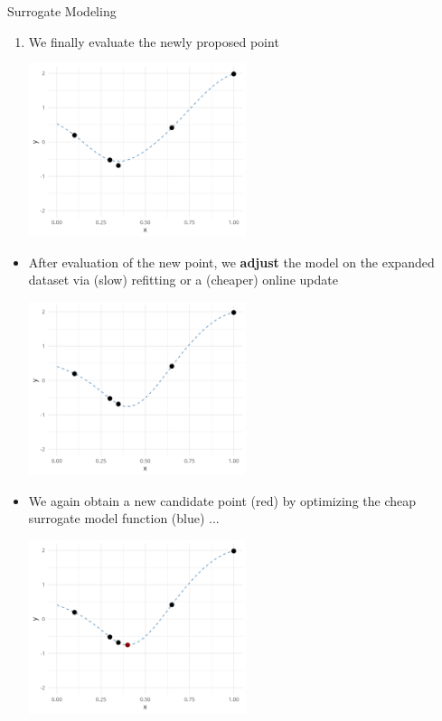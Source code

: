 \documentclass[11pt,compress,t,notes=noshow, xcolor=table]{beamer}
\begin{document}
\begin{vbframe}{Surrogate Modeling}
\begin{enumerate}
\framebreak 

\item We finally evaluate the newly proposed point
\vspace{+.45cm}

\begin{center}
  \includegraphics[width = 0.5\textwidth]{figure_man/loop_3.png}
\end{center}

\end{enumerate}

\framebreak 

\begin{itemize}

\item After evaluation of the new point, we \textbf{adjust} the model on the expanded dataset via (slow) refitting or a (cheaper) online update
\vspace{+.45cm}

\begin{center}
  \includegraphics[width = 0.5\textwidth]{figure_man/loop_4.png}
\end{center}

\framebreak 

\item We again obtain a new candidate point (red) by optimizing the cheap surrogate model function (blue) ...
\vspace{+.45cm}

\begin{center}
  \includegraphics[width = 0.5\textwidth]{figure_man/loop_5.png}
\end{center}


\end{itemize}
\end{vbframe}
\end{document}
